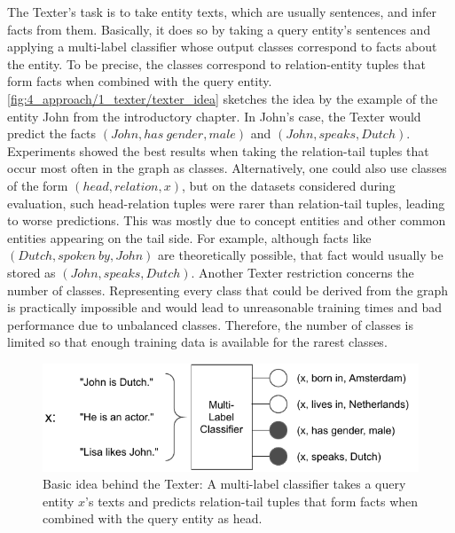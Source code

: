 The Texter's task is to take entity texts, which are usually sentences, and infer facts from them. Basically, it does so by taking a query entity's sentences and applying a multi-label classifier whose output classes correspond to facts about the entity. To be precise, the classes correspond to relation-entity tuples that form facts when combined with the query entity. \autoref{fig:4_approach/1_texter/texter_idea} sketches the idea by the example of the entity John from the introductory chapter. In John's case, the Texter would predict the facts $(John, has~gender, male)$ and $(John, speaks, Dutch)$. Experiments showed the best results when taking the relation-tail tuples that occur most often in the graph as classes. Alternatively, one could also use classes of the form $(head, relation, x)$, but on the datasets considered during evaluation, such head-relation tuples were rarer than relation-tail tuples, leading to worse predictions. This was mostly due to concept entities and other common entities appearing on the tail side. For example, although facts like $(Dutch, spoken~by, John)$ are theoretically possible, that fact would usually be stored as $(John, speaks, Dutch)$. Another Texter restriction concerns the number of classes. Representing every class that could be derived from the graph is practically impossible and would lead to unreasonable training times and bad performance due to unbalanced classes. Therefore, the number of classes is limited so that enough training data is available for the rarest classes.

\begin{figure}[t]
    \centering
    \includegraphics[width=\textwidth]{4_approach/1_texter/texter_idea}
    \caption{Basic idea behind the Texter: A multi-label classifier takes a query entity $x$'s texts and predicts relation-tail tuples that form facts when combined with the query entity as head.}
    \label{fig:4_approach/1_texter/texter_idea}
\end{figure}

